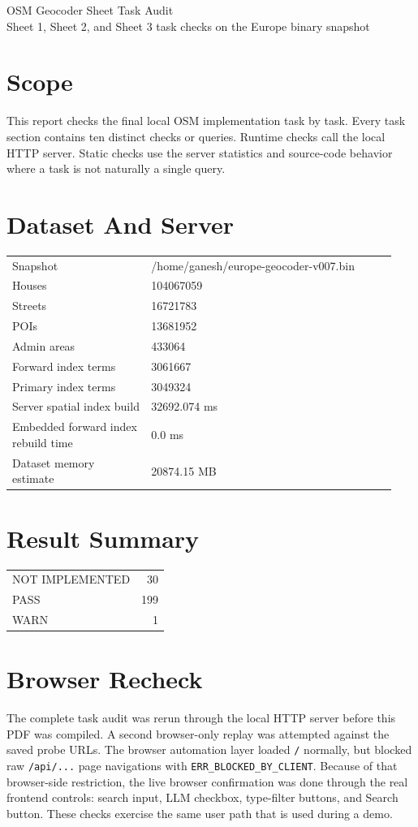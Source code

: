 \documentclass[10pt,a4paper]{article}
\begin{document}
\begin{center}
{\LARGE OSM Geocoder Sheet Task Audit}\\[4pt]
{\large Sheet 1, Sheet 2, and Sheet 3 task checks on the Europe binary snapshot}\\[3pt]
\end{center}
\section*{Scope}
This report checks the final local OSM implementation task by task. Every task section contains ten distinct checks or queries. Runtime checks call the local HTTP server. Static checks use the server statistics and source-code behavior where a task is not naturally a single query.
\section*{Dataset And Server}
\begin{tabular}{P{0.34\linewidth}P{0.60\linewidth}}
Snapshot & /home/ganesh/europe-geocoder-v007.bin\\
Houses & 104067059\\
Streets & 16721783\\
POIs & 13681952\\
Admin areas & 433064\\
Forward index terms & 3061667\\
Primary index terms & 3049324\\
Server spatial index build & 32692.074 ms\\
Embedded forward index rebuild time & 0.0 ms\\
Dataset memory estimate & 20874.15 MB\\
\end{tabular}
\section*{Result Summary}
\begin{tabular}{lr}
NOT IMPLEMENTED & 30\\
PASS & 199\\
WARN & 1\\
\end{tabular}

\section*{Browser Recheck}
The complete task audit was rerun through the local HTTP server before this PDF was compiled. A second browser-only replay was attempted against the saved probe URLs. The browser automation layer loaded \texttt{/} normally, but blocked raw \texttt{/api/...} page navigations with \texttt{ERR\_BLOCKED\_BY\_CLIENT}. Because of that browser-side restriction, the live browser confirmation was done through the real frontend controls: search input, LLM checkbox, type-filter buttons, and Search button. These checks exercise the same user path that is used during a demo.
\end{document}
